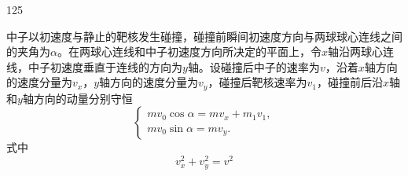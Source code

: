\begin{solution}{125}
    \begin{subsolution}
        中子以初速度与静止的靶核发生碰撞，碰撞前瞬间初速度方向与两球球心连线之间的夹角为$\alpha$。在两球心连线和中子初速度方向所决定的平面上，令$x$轴沿两球心连线，中子初速度垂直于连线的方向为$y$轴。设碰撞后中子的速率为$v$，沿着$x$轴方向的速度分量为$v _ { x }$，$y$轴方向的速度分量为$v _ { y }$，碰撞后靶核速率为$v _ { 1 }$，碰撞前后沿$x$轴和$y$轴方向的动量分别守恒
        \begin{equation}
            \left\{ \begin{array}{l} m v _ {0} \cos \alpha = m v _ {x} + m _ {1} v _ {1}, \\ m v _ {0} \sin \alpha = m v _ {y}. \end{array} \right.
            \label{eq:1.s125}
        \end{equation}
        式中
        \begin{equation}
            v _ {x} ^ {2} + v _ {y} ^ {2} = v ^ {2}
            \label{eq:2.s125}
        \end{equation}
        \bigskip
        \noindent [解法（二）

        由碰撞前后动量守恒，碰前中子的动量$m v _ { 0 }$、碰后中子的动量$m v$和碰后原子核的动量$m _ { 1 } v _ { 1 }$构成一闭合的矢量三角形，如解题图1a所示。据余弦定理有
        \begin{equation}
            m ^ {2} v _ {0} ^ {2} + m _ {1} ^ {2} v _ {1} ^ {2} - 2 m m _ {1} v _ {0} v _ {1} \cos \alpha = m ^ {2} v ^ {2}
            \label{eq:3.s125}
        \end{equation}
        式中，$\alpha$是碰前中子的动量与碰后原子核的动量之间的夹角。]


\end{subsolution}
\end{solution}
